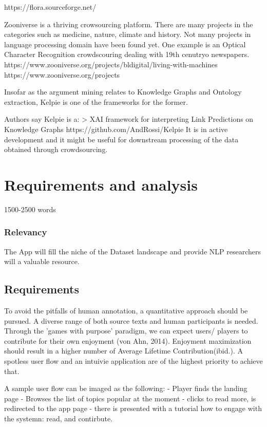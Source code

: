 \documentclass{article}
\begin{document}
https://flora.sourceforge.net/

Zooniverse is a thriving  crowsourcing platform. 
There are many projects in the categories such as medicine, nature, climate and history.
Not many projects in language processing domain have been found yet.
One example is an Optical Character Recognition crowdscouring dealing with 19th cenutryo newspapers.
https://www.zooniverse.org/projects/bldigital/living-with-machines
https://www.zooniverse.org/projects

Insofar as the argument mining relates to Knowledge Graphs and Ontology extraction, Kelpie is one of the frameworks for the former.

Authors say Kelpie is a:
> XAI framework for interpreting Link Predictions on Knowledge Graphs
https://github.com/AndRossi/Kelpie
It is in active development and it might be useful for downstream processing of the data obtained through crowdsourcing.

\newpage

\section{Requirements and analysis} 1500-2500 words

\subsubsection{Relevancy}
The App will fill the niche of the Dataset landscape and provide NLP researchers will a valuable resource.

\subsection{Requirements}
To avoid the pitfalls of human annotation, a quantitative approach should be pursued. 
A diverse range of both source texts and human participants is needed.
Through the 'games with purpose' paradigm, we can expect users/ players to contribute for their own enjoyment (von Ahn, 2014).
Enjoyment maximization should result in a higher number of Average Lifetime Contribution(ibid.).
A spotless user flow and an intuivie application are of the highest priority to achieve that.

A sample user flow can be imaged as the following:
- Player finds the landing page
- Browses the list of topics popular at the moment
- clicks to read more, is redirected to the app page
- there is presented with a tutorial how to engage with the systemn: read, and contirbute.
\end{document}
